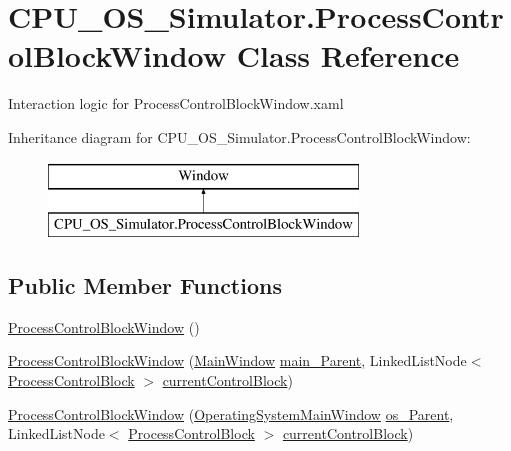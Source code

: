 \hypertarget{class_c_p_u___o_s___simulator_1_1_process_control_block_window}{}\section{C\+P\+U\+\_\+\+O\+S\+\_\+\+Simulator.\+Process\+Control\+Block\+Window Class Reference}
\label{class_c_p_u___o_s___simulator_1_1_process_control_block_window}


Interaction logic for Process\+Control\+Block\+Window.\+xaml  


Inheritance diagram for C\+P\+U\+\_\+\+O\+S\+\_\+\+Simulator.\+Process\+Control\+Block\+Window\+:\begin{figure}[H]
\begin{center}
\leavevmode
\includegraphics[height=2.000000cm]{class_c_p_u___o_s___simulator_1_1_process_control_block_window}
\end{center}
\end{figure}
\subsection*{Public Member Functions}
\begin{DoxyCompactItemize}
\item 
\hyperlink{class_c_p_u___o_s___simulator_1_1_process_control_block_window_afd4e9b7961d1f1c66aa037dba54d39a8}{Process\+Control\+Block\+Window} ()
\item 
\hyperlink{class_c_p_u___o_s___simulator_1_1_process_control_block_window_a4aed66a46265336cfe0cc5293c4e1164}{Process\+Control\+Block\+Window} (\hyperlink{class_c_p_u___o_s___simulator_1_1_main_window}{Main\+Window} \hyperlink{class_c_p_u___o_s___simulator_1_1_process_control_block_window_a928d5159874200e6ca0fad00913d65e5}{main\+\_\+\+Parent}, Linked\+List\+Node$<$ \hyperlink{class_c_p_u___o_s___simulator_1_1_operating___system_1_1_process_control_block}{Process\+Control\+Block} $>$ \hyperlink{class_c_p_u___o_s___simulator_1_1_process_control_block_window_a6019633d26586b0df1c4c2d6f008f6c9}{current\+Control\+Block})
\item 
\hyperlink{class_c_p_u___o_s___simulator_1_1_process_control_block_window_a79535cb1f910910d3cd9d896b7dd9fbc}{Process\+Control\+Block\+Window} (\hyperlink{class_c_p_u___o_s___simulator_1_1_operating_system_main_window}{Operating\+System\+Main\+Window} \hyperlink{class_c_p_u___o_s___simulator_1_1_process_control_block_window_acc4b72c5370a2bcda85b16e0801ce3d9}{os\+\_\+\+Parent}, Linked\+List\+Node$<$ \hyperlink{class_c_p_u___o_s___simulator_1_1_operating___system_1_1_process_control_block}{Process\+Control\+Block} $>$ \hyperlink{class_c_p_u___o_s___simulator_1_1_process_control_block_window_a6019633d26586b0df1c4c2d6f008f6c9}{current\+Control\+Block})
\end{DoxyCompactItemize}
